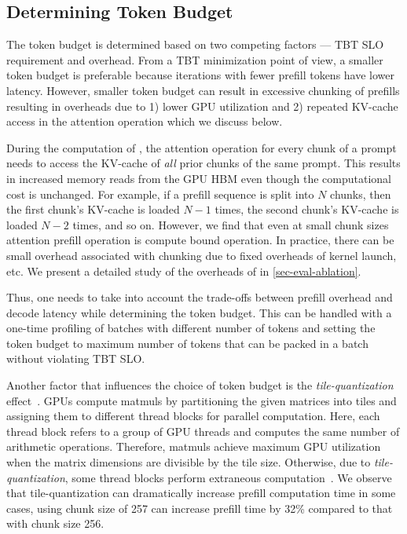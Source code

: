 \subsection{Determining Token Budget}
\label{section:howtopickachunksize}

The token budget is determined based on two competing factors --- TBT SLO requirement and \chunking overhead. From a TBT minimization point of view, a smaller token budget is preferable because iterations with fewer prefill tokens have lower latency. However, smaller token budget can result in excessive chunking of prefills resulting in overheads due to 1) lower GPU utilization and 2) repeated KV-cache access in the attention operation which we discuss below.

During the computation of \chunking, the attention operation for every chunk of a prompt needs to access the KV-cache of \textit{all} prior chunks of the same prompt. This results in increased memory reads from the GPU HBM even though the computational cost is unchanged. For example, if a prefill sequence is split into $N$ chunks, then the first chunk's KV-cache is loaded $N-1$ times, the second chunk's KV-cache is loaded $N-2$ times, and so on. However, we find that even at small chunk sizes attention prefill operation is compute bound operation. In practice, there can be small overhead associated with chunking due to fixed overheads of kernel launch, etc. We present a detailed study of the overheads of \chunking in \autoref{sec-eval-ablation}.


Thus, one needs to take into account the trade-offs between prefill overhead and decode latency while determining the token budget. This can be handled with a one-time profiling of batches with different number of tokens and setting the token budget to maximum number of tokens that can be packed in a batch without violating TBT SLO. 

Another factor that influences the choice of token budget is the \textit{tile-quantization} effect~\cite{tile-quantization}. GPUs compute matmuls by partitioning the given matrices into tiles and assigning them to different thread blocks for parallel computation. Here, each thread block refers to a group of GPU threads and computes the same number of arithmetic operations. Therefore, matmuls achieve maximum GPU utilization when the matrix dimensions are divisible by the tile size.  Otherwise, due to \textit{tile-quantization}, some thread blocks perform extraneous computation~\cite{tile-quantization}. We observe that tile-quantization can dramatically increase prefill computation time \eg in some cases, using chunk size of 257 can increase prefill time by 32\% compared to that with chunk size 256.

